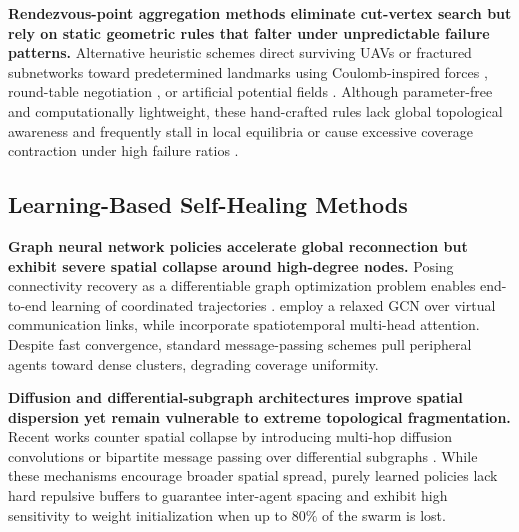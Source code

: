 \documentclass[11pt]{article}
\theoremstyle{plain}
\theoremstyle{definition}
\theoremstyle{remark}
\begin{document}
\textbf{Rendezvous-point aggregation methods eliminate cut-vertex search but rely on static geometric rules that falter under unpredictable failure patterns.} Alternative heuristic schemes direct surviving UAVs or fractured subnetworks toward predetermined landmarks using Coulomb-inspired forces \citep{joshi2012autonomous}, round-table negotiation \citep{shriwastav2018roundtable}, or artificial potential fields \citep{chen2020sidr,wang2024apfcpp}. Although parameter-free and computationally lightweight, these hand-crafted rules lack global topological awareness and frequently stall in local equilibria or cause excessive coverage contraction under high failure ratios \citep{tosun2024dpkcr}.

\subsection{Learning-Based Self-Healing Methods}
\textbf{Graph neural network policies accelerate global reconnection but exhibit severe spatial collapse around high-degree nodes.} Posing connectivity recovery as a differentiable graph optimization problem enables end-to-end learning of coordinated trajectories \citep{karalias2020erdos,peng2025prioritized}. \citet{mou2022resilient} employ a relaxed GCN over virtual communication links, while \citet{guo2024intelligent} incorporate spatiotemporal multi-head attention. Despite fast convergence, standard message-passing schemes pull peripheral agents toward dense clusters, degrading coverage uniformity.

\textbf{Diffusion and differential-subgraph architectures improve spatial dispersion yet remain vulnerable to extreme topological fragmentation.} Recent works counter spatial collapse by introducing multi-hop diffusion convolutions \citep{lin2024multihop} or bipartite message passing over differential subgraphs \citep{lin2025multihop}. While these mechanisms encourage broader spatial spread, purely learned policies lack hard repulsive buffers to guarantee inter-agent spacing and exhibit high sensitivity to weight initialization when up to $80\%$ of the swarm is lost.
\end{document}
